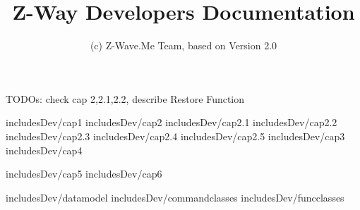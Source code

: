 \documentclass[10pt]{book}
\title{Z-Way Developers Documentation}
\author{(c) Z-Wave.Me Team, based on Version 2.0}
\date{}
\begin{document}
\maketitle
\tableofcontents


TODOs: check cap 2,2.1,2.2, describe Restore Function 

 {includesDev/cap1} 
 {includesDev/cap2} %
 {includesDev/cap2.1} %
 {includesDev/cap2.2} %
 {includesDev/cap2.3} %
 {includesDev/cap2.4} %
 {includesDev/cap2.5} %
 {includesDev/cap3} %
 {includesDev/cap4} %

 {includesDev/cap5} %
 {includesDev/cap6} %

 {includesDev/datamodel}
 {includesDev/commandclasses} 
 {includesDev/funcclasses}
\end{document}
